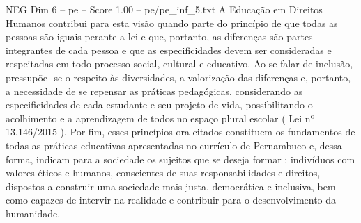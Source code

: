 \begin{textsample}{NEG Dim 6 – pe – Score 1.00 – pe/pe\_inf\_5.txt}
A Educação em Direitos Humanos contribui para esta visão quando parte do princípio de que todas as pessoas são iguais perante a lei e que, portanto, as diferenças são partes integrantes de cada pessoa e que as especificidades devem ser consideradas e respeitadas em todo processo social, cultural e educativo.
Ao se falar de inclusão, pressupõe -se o respeito às diversidades, a valorização das diferenças e, portanto, a necessidade de se repensar as práticas pedagógicas, considerando as especificidades de cada estudante e seu projeto de vida, possibilitando o acolhimento e a aprendizagem de todos no espaço plural escolar ( Lei nº 13.146/2015 ).
Por fim, esses princípios ora citados constituem os fundamentos de todas as práticas educativas apresentadas no currículo de Pernambuco e, dessa forma, indicam para a sociedade os sujeitos que se deseja formar : indivíduos com valores éticos e humanos, conscientes de suas responsabilidades e direitos, dispostos a construir uma sociedade mais justa, democrática e inclusiva, bem como capazes de intervir na realidade e contribuir para o desenvolvimento da humanidade.

\end{textsample}

